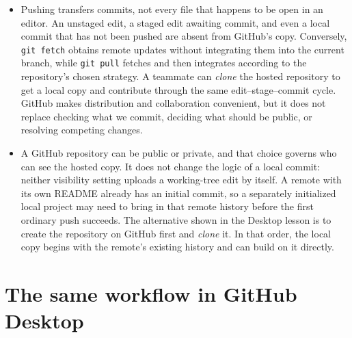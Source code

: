 \documentclass[10pt]{article}
\begin{document}
\begin{itemize}[leftmargin=1.25em, itemsep=0.3em, parsep=0pt, topsep=0pt]
    \item Pushing transfers commits, not every file that happens to be open in an editor. An unstaged edit, a staged edit awaiting commit, and even a local commit that has not been pushed are absent from GitHub's copy. Conversely, \texttt{git fetch} obtains remote updates without integrating them into the current branch, while \texttt{git pull} fetches and then integrates according to the repository's chosen strategy. A teammate can \emph{clone} the hosted repository to get a local copy and contribute through the same edit--stage--commit cycle. GitHub makes distribution and collaboration convenient, but it does not replace checking what we commit, deciding what should be public, or resolving competing changes.

    \item A GitHub repository can be public or private, and that choice governs who can see the hosted copy. It does not change the logic of a local commit: neither visibility setting uploads a working-tree edit by itself. A remote with its own README already has an initial commit, so a separately initialized local project may need to bring in that remote history before the first ordinary push succeeds. The alternative shown in the Desktop lesson is to create the repository on GitHub first and \emph{clone} it. In that order, the local copy begins with the remote's existing history and can build on it directly.
\end{itemize}

\section*{The same workflow in GitHub Desktop}
\end{document}
